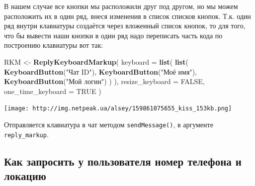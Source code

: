 \documentclass[
]{book}
\newenvironment{Shaded}{\begin{snugshade}}{\end{snugshade}}
\newcommand{\AttributeTok}[1]{\textcolor[rgb]{0.13,0.29,0.53}{#1}}
\newcommand{\ConstantTok}[1]{\textcolor[rgb]{0.56,0.35,0.01}{#1}}
\newcommand{\FunctionTok}[1]{\textcolor[rgb]{0.13,0.29,0.53}{\textbf{#1}}}
\newcommand{\NormalTok}[1]{#1}
\newcommand{\OtherTok}[1]{\textcolor[rgb]{0.56,0.35,0.01}{#1}}
\newcommand{\SpecialCharTok}[1]{\textcolor[rgb]{0.81,0.36,0.00}{\textbf{#1}}}
\newcommand{\StringTok}[1]{\textcolor[rgb]{0.31,0.60,0.02}{#1}}
\begin{document}
В нашем случае все кнопки мы расположили друг под другом, но мы можем расположить их в один ряд, внеся изменения в список списков кнопок. Т.к. один ряд внутри клавиатуры создаётся через вложенный список кнопок, то для того, что бы вывести наши кнопки в один ряд надо переписать часть кода по построению клавиатуры вот так:

\begin{Shaded}
\begin{Highlighting}[]
\NormalTok{RKM }\OtherTok{\textless{}{-}} \FunctionTok{ReplyKeyboardMarkup}\NormalTok{(}
    \AttributeTok{keyboard =} \FunctionTok{list}\NormalTok{(}
      \FunctionTok{list}\NormalTok{(}
          \FunctionTok{KeyboardButton}\NormalTok{(}\StringTok{"Чат ID"}\NormalTok{),}
          \FunctionTok{KeyboardButton}\NormalTok{(}\StringTok{"Моё имя"}\NormalTok{),}
          \FunctionTok{KeyboardButton}\NormalTok{(}\StringTok{"Мой логин"}\NormalTok{)}
\NormalTok{     )}
\NormalTok{    ),}
    \AttributeTok{resize\_keyboard =} \ConstantTok{FALSE}\NormalTok{,}
    \AttributeTok{one\_time\_keyboard =} \ConstantTok{TRUE}
\NormalTok{)}
\end{Highlighting}
\end{Shaded}

\texttt{[image: http://img.netpeak.ua/alsey/159861075655\_kiss\_153kb.png]}

Отправляется клавиатура в чат методом \texttt{sendMessage()}, в аргументе \texttt{reply\_markup}.

\begin{Shaded}
\end{Shaded}

\subsection{Как запросить у пользователя номер телефона и локацию}\label{ux43aux430ux43a-ux437ux430ux43fux440ux43eux441ux438ux442ux44c-ux443-ux43fux43eux43bux44cux437ux43eux432ux430ux442ux435ux43bux44f-ux43dux43eux43cux435ux440-ux442ux435ux43bux435ux444ux43eux43dux430-ux438-ux43bux43eux43aux430ux446ux438ux44e}
\end{document}
